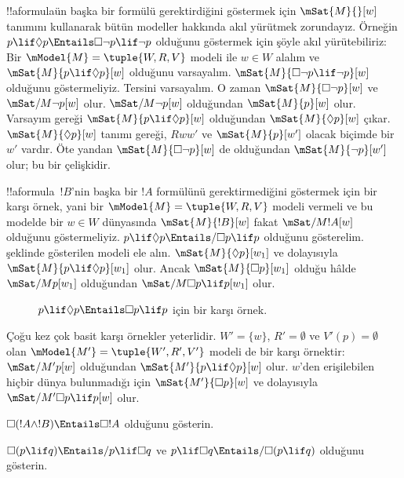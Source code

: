 \documentclass[../../../include/open-logic-section]{subfiles}
\begin{document}
\begin{ex}
  !!a{formula}{}ün başka bir formülü gerektirdiğini göstermek için
  $\mSat{M}{}[w]$ tanımını kullanarak bütün modeller hakkında akıl yürütmek
  zorundayız. Örneğin $p \lif \Diamond p \Entails \Box\lnot p \lif \lnot
  p$ olduğunu göstermek için şöyle akıl yürütebiliriz: Bir
  $\mModel{M} = \tuple{W, R, V}$ modeli ile $w \in W$ alalım ve
  $\mSat{M}{p \lif \Diamond p}[w]$ olduğunu varsayalım.
  $\mSat{M}{\Box\lnot p \lif \lnot p}[w]$ olduğunu göstermeliyiz. Tersini
  varsayalım. O zaman $\mSat{M}{\Box\lnot p}[w]$ ve
  $\mSat/{M}{\lnot p}[w]$ olur. $\mSat/{M}{\lnot p}[w]$ olduğundan
  $\mSat{M}{p}[w]$ olur. Varsayım gereği $\mSat{M}{p \lif \Diamond
  p}[w]$ olduğundan $\mSat{M}{\Diamond p}[w]$ çıkar. $\mSat{M}{\Diamond
  p}[w]$ tanımı gereği, $Rww'$ ve $\mSat{M}{p}[w']$ olacak biçimde bir
  $w'$ vardır. Öte yandan $\mSat{M}{\Box \lnot p}[w]$ de olduğundan
  $\mSat{M}{\lnot p}[w']$ olur; bu bir çelişkidir.

  !!a{formula}~$!B$'nin başka bir $!A$ formülünü gerektirmediğini
  göstermek için bir karşı örnek, yani bir $\mModel{M} = \tuple{W, R,
    V}$ modeli vermeli ve bu modelde bir $w \in W$ dünyasında
  $\mSat{M}{!B}[w]$ fakat $\mSat/{M}{!A}[w]$ olduğunu göstermeliyiz.
  $p \lif \Diamond p \Entails/ \Box p \lif p$ olduğunu gösterelim.
   şeklinde gösterilen modeli ele alın.
  $\mSat{M}{\Diamond
  p}[w_1]$ ve dolayısıyla $\mSat{M}{p \lif \Diamond p}[w_1]$ olur. Ancak
  $\mSat{M}{\Box p}[w_1]$ olduğu hâlde $\mSat/{M}{p}[w_1]$ olduğundan
  $\mSat/{M}{\Box p \lif p}[w_1]$ olur.
  \begin{figure}
  \begin{center}
  \end{center}
  \caption{$p \lif \Diamond p \Entails \Box p \lif p$ için bir karşı
  örnek.}
  \end{figure}
  
  Çoğu kez çok basit karşı örnekler yeterlidir. $W' = \{w\}$,
  $R' = \emptyset$ ve $V'(p) = \emptyset$ olan $\mModel{M'} =
  \tuple{W', R', V'}$ modeli de bir karşı örnektir: $\mSat/{M'}{p}[w]$
  olduğundan $\mSat{M'}{p \lif \Diamond p}[w]$ olur. $w$'den erişilebilen
  hiçbir dünya bulunmadığı için $\mSat{M'}{\Box p}[w]$ ve dolayısıyla
  $\mSat/{M'}{\Box p \lif p}[w]$ olur.
\end{ex}

\begin{prob}
  $\Box (!A \land !B) \Entails \Box !A$ olduğunu gösterin.
\end{prob}

\begin{prob}
  $\Box (p \lif q) \Entails/ p \lif \Box q$ ve $p \lif \Box
  q \Entails/\Box (p \lif q)$ olduğunu gösterin.
\end{prob}
\end{document}
